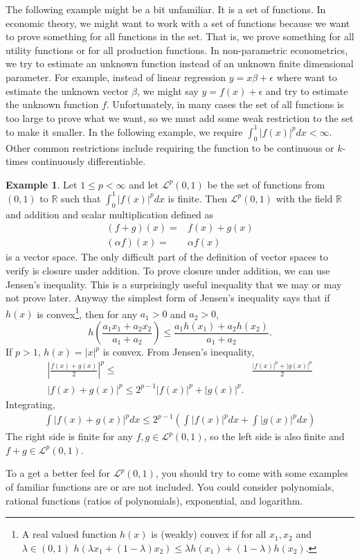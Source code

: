 \documentclass[12pt,reqno]{amsart}
\def\R{\mathbb{R}}
\theoremstyle{definition}
\newtheorem{example}{Example}[section]
\begin{document}
The following example might be a bit unfamiliar. It is a set of
functions. In economic theory, we might want to work with a set of
functions because we want to prove something for all functions in the
set. That is, we prove something for all utility functions or for all
production functions. In non-parametric econometrics, we try to
estimate an unknown function instead of an unknown finite dimensional
parameter. For example, instead of linear regression $y = x\beta +
\epsilon$ where want to estimate the unknown vector $\beta$, we might
say $y = f(x) + \epsilon$ and try to estimate the unknown function
$f$. Unfortunately, in many cases the set of all functions is too
large to prove what we want, so we must add some weak restriction to
the set to make it smaller. In the following example, we require
$\int_0^1 |f(x)|^p dx < \infty$. Other common restrictions include
requiring the function to be continuous or $k$-times continuously
differentiable.
\begin{example}\label{ex:LP}
  Let $1 \leq p < \infty$ and let $\mathcal{L}^p(0,1)$ be the set of
  functions from $(0,1)$ to $\R$ such that $\int_0^1 |f(x)|^p dx$ is
  finite.  Then $\mathcal{L}^p (0,1)$ with the field $\R$ and addition
  and scalar multiplication defined as
  \begin{align*}
    (f + g)(x) = & f(x) + g(x) \\
    (\alpha f)(x) = & \alpha f(x)
  \end{align*} 
  is a vector space.  The only difficult part of the definition of
  vector spaces to verify is closure under addition. To prove closure
  under addition, we can use Jensen's inequality. This is a
  surprisingly useful inequality that we may or may not prove
  later. Anyway the simplest form of Jensen's inequality says that if
  $h(x)$ is convex\footnote{A real valued function $h(x)$ is (weakly)
    convex if for all $x_1,x_2$ and $\lambda \in (0,1)$ $h(\lambda x_1
    + (1-\lambda) x_2) \leq \lambda h(x_1) + (1-\lambda) h(x_2)$.},
  then for any $a_1>0$ and $a_2>0$,
  \[ h\left(\frac{a_1 x_1 + a_2 x_2}{a_1 + a_2} \right) \leq \frac{a_1
    h(x_1) + a_2 h(x_2) }{a_1 + a_2}. \]
  If $p>1$, $h(x) = |x|^p$ is convex. From Jensen's inequality,
  \begin{align*}
    | \frac{f(x) + g(x)}{2} |^p \leq & \frac{|f(x)|^p + |g(x)|^p}{2}
    \\
    |f(x) + g(x) |^p \leq 2^{p-1} |f(x)|^p + |g(x)|^p. 
  \end{align*}
  Integrating,
  \begin{align*}
    \int |f(x) + g(x) |^p dx \leq 2^{p-1} \left(\int|f(x)|^p dx + \int
      |g(x)|^p dx \right)
  \end{align*}
  The right side is finite for any $f, g \in \mathcal{L}^p(0,1)$, so
  the left side is also finite and $f+g \in \mathcal{L}^p(0,1)$. 
  
  To a get a better feel for $\mathcal{L}^p(0,1)$, you should try to
  come with some examples of familiar functions are or are not
  included. You could consider polynomials, rational functions (ratios
  of polynomials), exponential, and logarithm.
\end{example}
\end{document}

